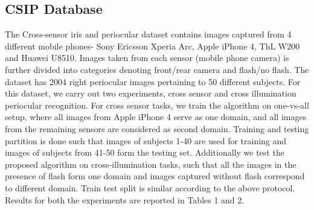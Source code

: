 \documentclass[10pt,twocolumn,letterpaper]{article}
\begin{document}
\subsection{CSIP Database}
  \vspace{-4pt}
The Cross-sensor iris and periocular dataset \cite{santos2015fusing} contains images captured from 4 different mobile phones- Sony Ericsson Xperia Arc, Apple iPhone 4, ThL W200 and Huawei U8510. Images taken from each sensor (mobile phone camera) is further divided into categories denoting front/rear camera and flash/no flash.  The dataset has 2004 right periocular images pertaining to 50 different subjects.
For this dataset, we carry out two experiments, cross sensor and cross illumination periocular recognition. For cross sensor tasks, we train the algorithm on one-vs-all setup, where all images from Apple iPhone 4 serve as one domain, and all images from the remaining sensors are considered as second domain. Training and testing partition is done such that images of subjects 1-40 are used for training and images of subjects from 41-50 form the testing set. 
Additionally we test the proposed algorithm on cross-illumination tasks, such that all the images in the presence of flash form one domain and images captured without flash correspond to different domain. Train test split is similar according to the above protocol.
Results for both the experiments are reported in Tables 1 and 2.


\end{document}
